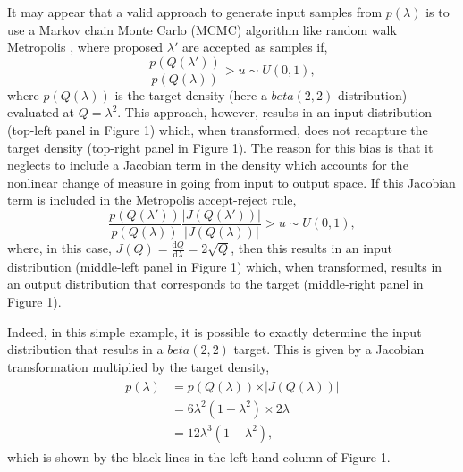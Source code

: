 \documentclass[10pt,letterpaper]{article}
\begin{document}
It may appear that a valid approach to generate input samples from $p(\lambda)$ is to use a Markov chain Monte Carlo (MCMC) algorithm like random walk Metropolis \cite{metropolis1953equation}, where proposed $\lambda'$ are accepted as samples if,
%
\begin{equation}\label{eq:naiveMetropolis}
\frac{p(Q(\lambda'))}{p(Q(\lambda))}>u\sim U(0,1),
\end{equation}
%
where $p(Q(\lambda))$ is the target density (here a $beta(2,2)$ distribution) evaluated at $Q=\lambda^{2}$. This approach, however, results in an input distribution (top-left panel in Figure 1) which, when transformed, does not recapture the target density (top-right panel in Figure 1). The reason for this bias is that it neglects to include a Jacobian term in the density which accounts for the nonlinear change of measure in going from input to output space. If this Jacobian term is included in the Metropolis accept-reject rule,
%
\begin{equation}\label{eq:jacobianMetropolis}
\frac{p(Q(\lambda'))}{p(Q(\lambda))}\frac{\vert J(Q(\lambda')) \vert}{\vert J(Q(\lambda)) \vert}>u\sim U(0,1),
\end{equation}
%
where, in this case, $J(Q) = \frac{\mathrm{d}Q}{\mathrm{d}\lambda} =  2 \sqrt{Q}$, then this results in an input distribution (middle-left panel in Figure 1) which, when transformed, results in an output distribution that corresponds to the target (middle-right panel in Figure 1).

Indeed, in this simple example, it is possible to exactly determine the input distribution that results in a $beta(2,2)$ target. This is given by a Jacobian transformation multiplied by the target density,
%
\begin{equation}
\begin{gathered}\begin{aligned}
p(\lambda) &= p(Q(\lambda)) \times \vert J(Q(\lambda)) \vert   \\
           &= 6 \lambda^2 (1 - \lambda^2) \times 2 \lambda     \\
           & = 12 \lambda^3 (1- \lambda^2),
\end{aligned} \end{gathered}
\end{equation}
%
which is shown by the black lines in the left hand column of Figure 1.
\end{document}
